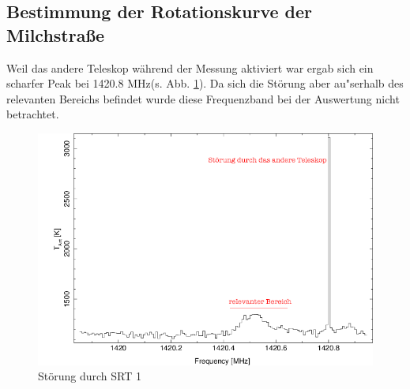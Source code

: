 \subsection{Bestimmung der Rotationskurve der Milchstraße}
Weil das andere Teleskop während der Messung aktiviert war ergab sich ein scharfer Peak bei 1420.8 MHz(s. Abb. \ref{spektrum_beispiel}). Da sich die Störung aber au"serhalb des relevanten Bereichs befindet wurde diese Frequenzband bei der Auswertung nicht betrachtet.
\begin{figure}
    \includegraphics[width=.8\textwidth]{spektrum_beispiel.png}
    \caption{Störung durch SRT 1}
    \label{spektrum_beispiel}
\end{figure}
